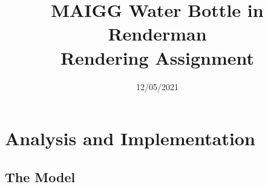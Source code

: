 \documentclass[notitlepage,12pt]{article}
\title{%
MAIGG Water Bottle in Renderman  \\
\large Rendering Assignment}
\author{}
\date{12/05/2021}
\begin{document}
\maketitle




\section{Analysis and Implementation}


\subsection{The Model} \label{section:model}
\end{document}
